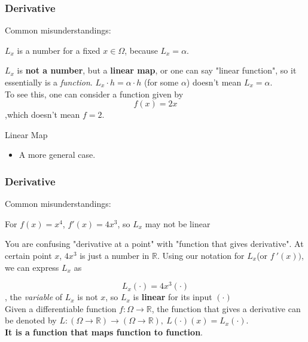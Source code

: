 \documentclass{beamer}
\begin{document}
\begin{frame}
    \frametitle{Derivative}
Common misunderstandings:\\
\vspace{0.5em}
    \begin{center}
        $L_x$ is a number for a fixed $x\in \Omega$, because $L_x=\alpha$.
    \end{center}
\vspace{0.5em}
\hspace{1em}
$L_x$ is \textbf{not a number}, but a \textbf{linear map}, or one can say "linear function", so it essentially is a \emph{function}.
$L_x\cdot h=\alpha\cdot h$ (for some $\alpha$) doesn't mean $L_x=\alpha$.\\
\hspace{1em} To see this, one can consider a function given by 
\begin{equation*}
    f(x)=2x
\end{equation*}
,which doesn't mean $f=2$.\\

\begin{block}{Linear Map}
    \begin{itemize}
        \item A more general case.
    \end{itemize}
\end{block}
\end{frame}
\begin{frame}
    \frametitle{Derivative}

    Common misunderstandings:\\
\vspace{0.5em}
    \begin{center}
        For $f(x)=x^4$, $f'(x)=4x^3$, so $L_x$ may not be linear
    \end{center}
\vspace{0.5em}

\hspace{1em} You are confusing "derivative at a point" with "function that gives derivative".
At certain point $x$, $4x^3$ is just a number in $\mathbb{R}$. Using our notation for $L_x$(or $f~'(x))$, 
we can express $L_x$ as 

\begin{equation*}
    L_x(\cdot)=4x^3(\cdot)
\end{equation*}
, the \emph{variable} of $L_x$ is not $x$, so $L_x$ is \textbf{linear} for its input $(\cdot)$\\
\vspace{1em}
Given a differentiable function $f:\Omega\rightarrow\mathbb{R}$, the function 
that gives a derivative can be denoted by $L:(\Omega\rightarrow\mathbb{R}) \to (\Omega\rightarrow\mathbb{R}),\ L(\cdot)(x)=L_x(\cdot)$.\\
\textbf{It is a function that maps function to function}.

    
\end{frame}
\end{document}
